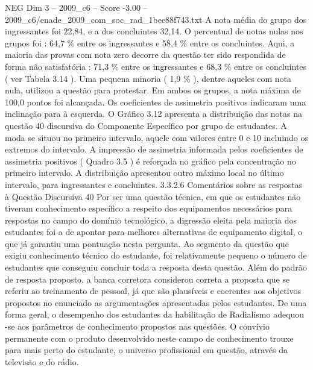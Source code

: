 \begin{textsample}{NEG Dim 3 – 2009\_c6 – Score -3.00 – 2009\_c6/enade\_2009\_com\_soc\_rad\_1bee88f743.txt}
A nota média do grupo dos ingressantes foi 22,84, e a dos concluintes 32,14.
O percentual de notas nulas nos grupos foi : 64,7 \% entre os ingressantes e 58,4 \% entre os concluintes.
Aqui, a maioria das provas com nota zero decorre da questão ter sido respondida de forma não satisfatória : 71,3 \% entre os ingressantes e 68,3 \% entre os concluintes ( ver Tabela 3.14 ).
Uma pequena minoria ( 1,9 \% ), dentre aqueles com nota nula, utilizou a questão para protestar.
Em ambos os grupos, a nota máxima de 100,0 pontos foi alcançada.
Os coeficientes de assimetria positivos indicaram uma inclinação para à esquerda.
O Gráfico 3.12 apresenta a distribuição das notas na questão 40 discursiva do Componente Específico por grupo de estudantes.
A moda se situou no primeiro intervalo, aquele com valores entre 0 e 10 incluindo os extremos do intervalo.
A impressão de assimetria informada pelos coeficientes de assimetria positivos ( Quadro 3.5 ) é reforçada no gráfico pela concentração no primeiro intervalo.
A distribuição apresentou outro máximo local no último intervalo, para ingressantes e concluintes. 3.3.2.6 Comentários sobre as respostas à Questão Discursiva 40 Por ser uma questão técnica, em que os estudantes não tiveram conhecimento específico a respeito dos equipamentos necessários para respostas no campo do domínio tecnológico, a digressão eleita pela maioria dos estudantes foi a de apontar para melhores alternativas de equipamento digital, o que já garantiu uma pontuação nesta pergunta.
Ao segmento da questão que exigiu conhecimento técnico do estudante, foi relativamente pequeno o número de estudantes que conseguiu concluir toda a resposta desta questão.
Além do padrão de resposta proposto, a banca corretora considerou correta a proposta que se referiu ao treinamento de pessoal, já que são plausíveis e coerentes aos objetivos propostos no enunciado as argumentações apresentadas pelos estudantes.
De uma forma geral, o desempenho dos estudantes da habilitação de Radialismo adequou -se aos parâmetros de conhecimento propostos nas questões.
O convívio permanente com o produto desenvolvido neste campo de conhecimento trouxe para mais perto do estudante, o universo profissional em questão, através da televisão e do rádio.

\end{textsample}
